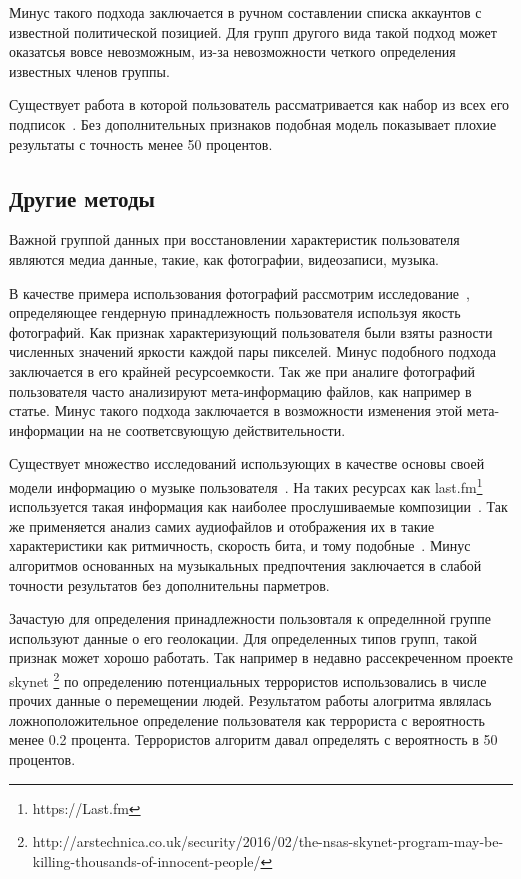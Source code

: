 \documentclass[annotation,times,page4]{itmo-student-thesis}
\begin{document}
Минус такого подхода заключается в ручном составлении списка аккаунтов с известной политической позицией. Для групп другого вида такой подход может оказатсья вовсе невозможным, из-за невозможности четкого определения известных членов группы.

Существует работа в которой пользователь рассматривается как набор из всех его подписок~\cite{zheleva2009join,}. Без дополнительных признаков подобная модель показывает плохие результаты с точность менее 50 процентов. 
  
\subsection{Другие методы}
Важной группой данных при восстановлении характеристик пользователя являются медиа данные, такие, как фотографии, видеозаписи, музыка. 

В качестве примера использования фотографий рассмотрим исследование~\cite{baluja2007boosting,}, определяющее гендерную принадлежность пользователя используя якость фотографий. Как признак характеризующий пользователя были взяты разности численных значений яркости каждой пары пикселей. Минус подобного подхода заключается в его крайней ресурсоемкости. Так же при аналиге фотографий пользователя часто анализируют мета-информацию файлов, как например в статье. Минус такого подхода заключается в возможности изменения этой мета-информации на не соответсвующую действительности.

Существует множество исследований использующих в качестве основы своей модели информацию о музыке пользователя~\cite{wu2014gender,liu2012inferring}. На таких ресурсах как last.fm\footnote{https://Last.fm} используется такая информация как наиболее прослушиваемые композиции~\cite{wu2014gender}. Так же применяется анализ самих аудиофайлов и отображения их в такие характеристики как ритмичность, скорость бита, и тому подобные~\cite{liu2012inferring}. Минус алгоритмов основанных на музыкальных предпочтения заключается в слабой точности результатов без дополнительны парметров.

Зачастую для определения принадлежности пользовталя к определнной группе используют данные о его геолокации. Для определенных типов групп, такой признак может хорошо работать. Так например в недавно рассекреченном проекте skynet \footnote{http://arstechnica.co.uk/security/2016/02/the-nsas-skynet-program-may-be-killing-thousands-of-innocent-people/} по определению потенциальных террористов использовались в числе прочих данные о перемещении людей. Результатом работы алогритма являлась ложноположительное определение пользователя как террориста с вероятность менее 0.2 процента. Террористов алгоритм давал определять с вероятность в 50 процентов.
\end{document}
